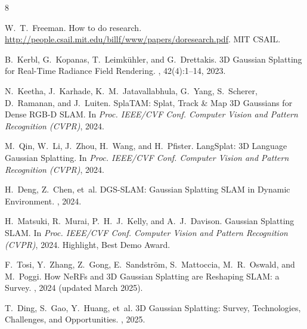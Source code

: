 \documentclass[10pt,twocolumn,letterpaper]{article}
\begin{document}
{\small
\begin{thebibliography}{8}

W.~T.~Freeman.
\newblock How to do research.
\newblock \url{http://people.csail.mit.edu/billf/www/papers/doresearch.pdf}. MIT CSAIL.

B.~Kerbl, G.~Kopanas, T.~Leimk{\"u}hler, and G.~Drettakis.
\newblock 3D Gaussian Splatting for Real-Time Radiance Field Rendering.
, 42(4):1--14, 2023.

N.~Keetha, J.~Karhade, K.~M.~Jatavallabhula, G.~Yang, S.~Scherer, D.~Ramanan, and J.~Luiten.
\newblock SplaTAM: Splat, Track \& Map 3D Gaussians for Dense RGB-D SLAM.
\newblock In {\em Proc. IEEE/CVF Conf. Computer Vision and Pattern Recognition (CVPR)}, 2024.

M.~Qin, W.~Li, J.~Zhou, H.~Wang, and H.~Pfister.
\newblock LangSplat: 3D Language Gaussian Splatting.
\newblock In {\em Proc. IEEE/CVF Conf. Computer Vision and Pattern Recognition (CVPR)}, 2024.

H.~Deng, Z.~Chen, et~al.
\newblock DGS-SLAM: Gaussian Splatting SLAM in Dynamic Environment.
, 2024.

H.~Matsuki, R.~Murai, P.~H.~J.~Kelly, and A.~J.~Davison.
\newblock Gaussian Splatting SLAM.
\newblock In {\em Proc. IEEE/CVF Conf. Computer Vision and Pattern Recognition (CVPR)}, 2024. Highlight, Best Demo Award.

F.~Tosi, Y.~Zhang, Z.~Gong, E.~Sandstr{\"o}m, S.~Mattoccia, M.~R.~Oswald, and M.~Poggi.
\newblock How NeRFs and 3D Gaussian Splatting are Reshaping SLAM: a Survey.
, 2024 (updated March 2025).

T.~Ding, S.~Gao, Y.~Huang, et~al.
\newblock 3D Gaussian Splatting: Survey, Technologies, Challenges, and Opportunities.
, 2025.

\end{thebibliography}
}
\end{document}
